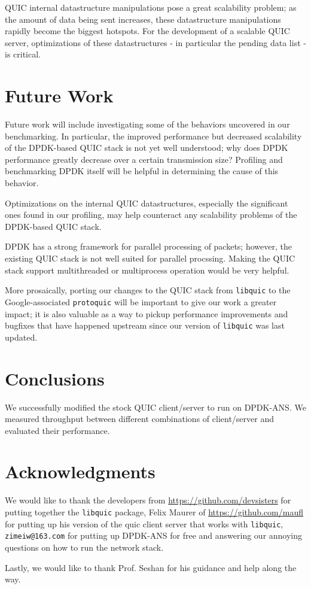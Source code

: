 \documentclass{sig-alternate-05-2015}
\begin{document}
QUIC internal datastructure manipulations pose a great scalability problem;
as the amount of data being sent increases,
these datastructure manipulations rapidly become the biggest hotspots.
For the development of a scalable QUIC server, optimizations of these datastructures
- in particular the pending data list -
is critical.

\section{Future Work}

Future work will include investigating some of the behaviors uncovered in our benchmarking.
In particular, the improved performance but decreased scalability of the DPDK-based QUIC stack
is not yet well understood;
why does DPDK performance greatly decrease over a certain transmission size?
Profiling and benchmarking DPDK itself will be helpful in determining the cause of this behavior.

Optimizations on the internal QUIC datastructures,
especially the significant ones found in our profiling,
may help counteract any scalability problems of the DPDK-based QUIC stack.

DPDK has a strong framework for parallel processing of packets;
however, the existing QUIC stack is not well suited for parallel procssing.
Making the QUIC stack support multithreaded or multiprocess operation would be very helpful.

More prosaically, porting our changes to the QUIC stack from \texttt{libquic}
to the Google-associated \texttt{protoquic}
will be important to give our work a greater impact;
it is also valuable as a way to pickup performance improvements and bugfixes that have happened upstream
since our version of \texttt{libquic} was last updated.

\section{Conclusions}
We successfully modified the stock QUIC client/server to run on DPDK-ANS. We measured throughput between different combinations of client/server and evaluated their performance.

\section{Acknowledgments}
We would like to thank the developers from \url{https://github.com/devsisters} for putting together the \texttt{libquic} package, Felix Maurer of \url{https://github.com/maufl} for putting up his version of the quic client server that works with \texttt{libquic}, \texttt{zimeiw@163.com} for putting up DPDK-ANS for free and answering our annoying questions on how to run the network stack.

Lastly, we would like to thank Prof. Seshan for his guidance and help along the way.




\end{document}
